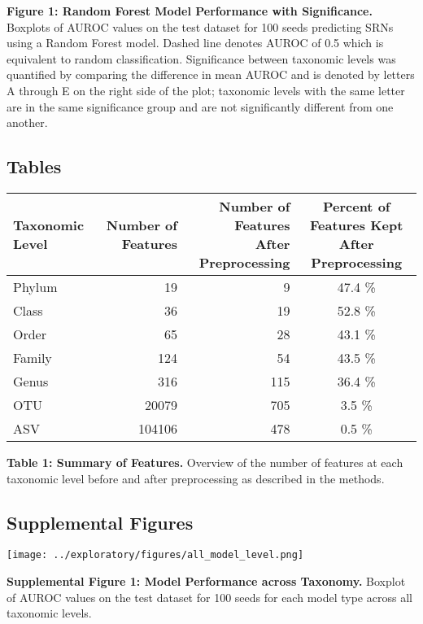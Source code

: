 \documentclass[
]{article}
\begin{document}
\textbf{Figure 1: Random Forest Model Performance with Significance.}
Boxplots of AUROC values on the test dataset for 100 seeds predicting
SRNs using a Random Forest model. Dashed line denotes AUROC of 0.5 which
is equivalent to random classification. Significance between taxonomic
levels was quantified by comparing the difference in mean AUROC and is
denoted by letters A through E on the right side of the plot; taxonomic
levels with the same letter are in the same significance group and are
not significantly different from one another.

\newpage

\hypertarget{tables}{%
\subsection{Tables}\label{tables}}

\begin{longtable}[]{@{}lrrc@{}}
\toprule
Taxonomic Level & Number of Features &
\makecell[c]{Number of Features \\ After Preprocessing} &
\makecell[c]{Percent of Features Kept \\ After Preprocessing} \\
\midrule
\endhead
Phylum & 19 & 9 & 47.4 \% \\
Class & 36 & 19 & 52.8 \% \\
Order & 65 & 28 & 43.1 \% \\
Family & 124 & 54 & 43.5 \% \\
Genus & 316 & 115 & 36.4 \% \\
OTU & 20079 & 705 & 3.5 \% \\
ASV & 104106 & 478 & 0.5 \% \\
\bottomrule
\end{longtable}

\textbf{Table 1: Summary of Features.} Overview of the number of
features at each taxonomic level before and after preprocessing as
described in the methods.

\newpage

\hypertarget{supplemental-figures}{%
\subsection{Supplemental Figures}\label{supplemental-figures}}

\texttt{[image: ../exploratory/figures/all\_model\_level.png]}

\textbf{Supplemental Figure 1: Model Performance across Taxonomy.}
Boxplot of AUROC values on the test dataset for 100 seeds for each model
type across all taxonomic levels.
\end{document}
